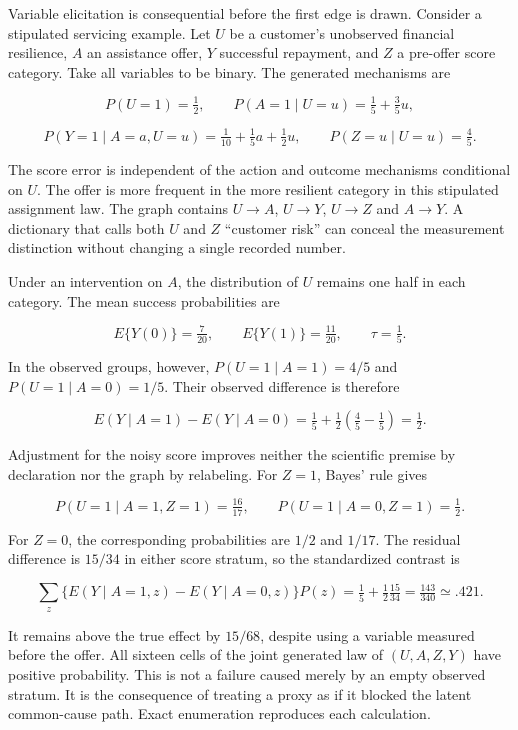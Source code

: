 Variable elicitation is consequential before the first edge is drawn.
Consider a stipulated servicing example. Let \(U\) be a customer's
unobserved financial resilience, \(A\) an assistance offer, \(Y\)
successful repayment, and \(Z\) a pre-offer score category. Take all
variables to be binary. The generated mechanisms are

\[
 P(U=1)=\tfrac12,\qquad
 P(A=1\mid U=u)=\tfrac15+\tfrac35u,
\]

\[
 P(Y=1\mid A=a,U=u)=\tfrac1{10}+\tfrac15a+\tfrac12u,
 \qquad P(Z=u\mid U=u)=\tfrac45.
\]

The score error is independent of the action and outcome mechanisms
conditional on \(U\). The offer is more frequent in the more resilient
category in this stipulated assignment law. The graph contains
\(U\to A\), \(U\to Y\), \(U\to Z\) and \(A\to Y\). A dictionary that
calls both \(U\) and \(Z\) ``customer risk'' can conceal the measurement
distinction without changing a single recorded number.

Under an intervention on \(A\), the distribution of \(U\) remains one
half in each category. The mean success probabilities are

\[
 E\{Y(0)\}=\tfrac7{20},\qquad
 E\{Y(1)\}=\tfrac{11}{20},\qquad
 \tau=\tfrac15.
\]

In the observed groups, however, \(P(U=1\mid A=1)=4/5\) and
\(P(U=1\mid A=0)=1/5\). Their observed difference is therefore

\[
 E(Y\mid A=1)-E(Y\mid A=0)
 =\tfrac15+\tfrac12\left(\tfrac45-\tfrac15\right)=\tfrac12.
\]

Adjustment for the noisy score improves neither the scientific premise
by declaration nor the graph by relabeling. For \(Z=1\), Bayes' rule
gives

\[
 P(U=1\mid A=1,Z=1)=\tfrac{16}{17},\qquad
 P(U=1\mid A=0,Z=1)=\tfrac12.
\]

For \(Z=0\), the corresponding probabilities are \(1/2\) and \(1/17\).
The residual difference is \(15/34\) in either score stratum, so the
standardized contrast is

\[
 \sum_z\{E(Y\mid A=1,z)-E(Y\mid A=0,z)\}P(z)
 =\tfrac15+\tfrac12\tfrac{15}{34}
 =\tfrac{143}{340}\simeq .421.
\]

It remains above the true effect by \(15/68\), despite using a variable
measured before the offer. All sixteen cells of the joint generated law
of \((U,A,Z,Y)\) have positive probability. This is not a failure caused
merely by an empty observed stratum. It is the consequence of treating a
proxy as if it blocked the latent common-cause path. Exact enumeration
reproduces each calculation. \citep{exec13_diagram_examples}

